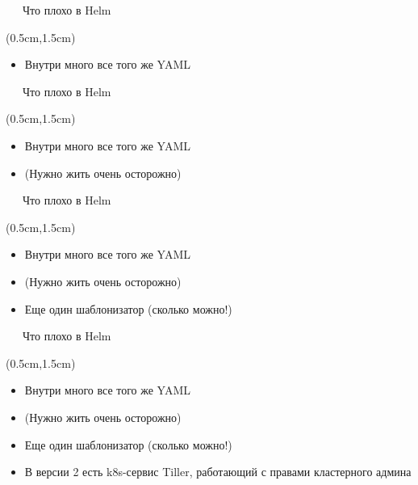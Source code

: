 \documentclass[xetex,18pt,aspectratio=43]{beamer}
\begin{document}
\begin{Large}
\begin{frame}{\ \ \ Что плохо в Helm}
\begin{textblock*}{\framewidth-0.8cm}(0.5cm,1.5cm)
\begin{itemize}
  \item Внутри много все того же YAML
\end{itemize}
\end{textblock*}
\end{frame}

\begin{frame}{\ \ \ Что плохо в Helm}
\begin{textblock*}{\framewidth-0.8cm}(0.5cm,1.5cm)
\begin{itemize}
  \item Внутри много все того же YAML
  \item (Нужно жить очень осторожно)
\end{itemize}
\end{textblock*}
\end{frame}

\begin{frame}{\ \ \ Что плохо в Helm}
\begin{textblock*}{\framewidth-0.8cm}(0.5cm,1.5cm)
\begin{itemize}
  \item Внутри много все того же YAML
  \item (Нужно жить очень осторожно)
  \item Еще один шаблонизатор (сколько можно!)
\end{itemize}
\end{textblock*}
\end{frame}

\begin{frame}{\ \ \ Что плохо в Helm}
\begin{textblock*}{\framewidth-0.8cm}(0.5cm,1.5cm)
\begin{itemize}
  \item Внутри много все того же YAML
  \item (Нужно жить очень осторожно)
  \item Еще один шаблонизатор (сколько можно!)
  \item В версии 2 есть k8s-сервис Tiller, работающий с правами кластерного админа
\end{itemize}
\end{textblock*}
\end{frame}


\end{Large}
\end{document}
